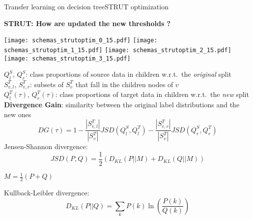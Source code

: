 \begin{frame}{Transfer learning on decision tree}{STRUT optimization}

\begin{minipage}[t]{0.4\linewidth}
    \vspace{0pt}
    
    \centering
    \textbf{STRUT: How are updated the new thresholds ?}\\

    \renewcommand{\ratio}{1.0}
    \begin{overprint}
        \texttt{[image: schemas\_strutoptim\_0\_15.pdf]}
        \texttt{[image: schemas\_strutoptim\_1\_15.pdf]}
        \texttt{[image: schemas\_strutoptim\_2\_15.pdf]}
        \texttt{[image: schemas\_strutoptim\_3\_15.pdf]}
    \end{overprint}
\end{minipage}\hfill
\begin{minipage}[t]{0.55\linewidth}
    \vspace{0pt}
    \pause \pause
    $Q_{l}^{S}$, $Q_{r}^{S}$: class proportions of source data in children w.r.t.\ the \emph{original} split\\
    \pause
    $S_{v,l}^{T}$, $S_{v,r}^{T}$: subsets of $S_{v}^{T}$ that fall in the children nodes of $v$\\
    $Q_{l}^{T}(\tau)$, $Q_{r}^{T}(\tau)$: class proportions of target data in children w.r.t.\ the \emph{new} split\\
    \pause
    \textbf{Divergence Gain}: similarity between the original label distributions and the new ones
    $$
    DG\left(\tau\right) = 1 - \frac{|S_{v,l}^{T}|}{|S_{v}^{T}|}JSD(Q_{l}^{S}, Q_{l}^{T})
    - \frac{|S_{v,r}^{T}|}{|S_{v}^{T}|}JSD(Q_{r}^{S}, Q_{r}^{T})
    $$
    \small
    Jensen-Shannon divergence:
    $$JSD(P, Q) = \frac{1}{2}\left(D_{KL}(P||M) + D_{KL}(Q||M)\right) $$
    \begin{flushright}
    $M = \frac{1}{2} \left(P +Q\right) $
    \end{flushright}
    Kullback-Leibler divergence:
    $$D_{KL}(P||Q) = \sum_{k}{P(k)\ln\left(\frac{P(k)}{Q(k)}\right)}$$
\end{minipage}

\end{frame}

